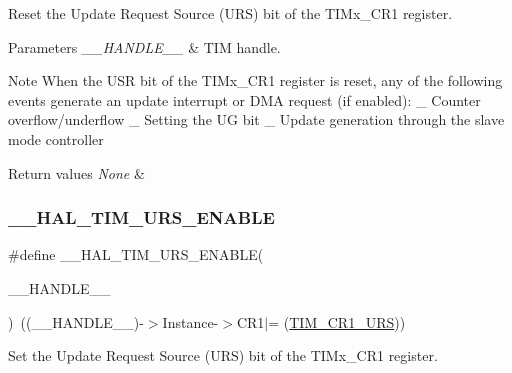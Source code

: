 Reset the Update Request Source (U\+RS) bit of the T\+I\+Mx\+\_\+\+C\+R1 register. 


\begin{DoxyParams}{Parameters}
{\em \+\_\+\+\_\+\+H\+A\+N\+D\+L\+E\+\_\+\+\_\+} & T\+IM handle. \\
\hline
\end{DoxyParams}
\begin{DoxyNote}{Note}
When the U\+SR bit of the T\+I\+Mx\+\_\+\+C\+R1 register is reset, any of the following events generate an update interrupt or D\+MA request (if enabled)\+: \+\_\+ Counter overflow/underflow \+\_\+ Setting the UG bit \+\_\+ Update generation through the slave mode controller 
\end{DoxyNote}

\begin{DoxyRetVals}{Return values}
{\em None} & \\
\hline
\end{DoxyRetVals}
\mbox{\label{group___t_i_m___exported___macros_ga3b06856bd6d7e10cfff342b1726db51d}} 
\subsubsection{\texorpdfstring{\+\_\+\+\_\+\+H\+A\+L\+\_\+\+T\+I\+M\+\_\+\+U\+R\+S\+\_\+\+E\+N\+A\+B\+LE}{\_\_HAL\_TIM\_URS\_ENABLE}}
{\footnotesize\ttfamily \#define \+\_\+\+\_\+\+H\+A\+L\+\_\+\+T\+I\+M\+\_\+\+U\+R\+S\+\_\+\+E\+N\+A\+B\+LE(\begin{DoxyParamCaption}\item[{}]{\+\_\+\+\_\+\+H\+A\+N\+D\+L\+E\+\_\+\+\_\+ }\end{DoxyParamCaption})~((\+\_\+\+\_\+\+H\+A\+N\+D\+L\+E\+\_\+\+\_\+)-\/$>$Instance-\/$>$C\+R1$\vert$= (\mbox{\hyperlink{group___peripheral___registers___bits___definition_ga06c997c2c23e8bef7ca07579762c113b}{T\+I\+M\+\_\+\+C\+R1\+\_\+\+U\+RS}}))}



Set the Update Request Source (U\+RS) bit of the T\+I\+Mx\+\_\+\+C\+R1 register. 


